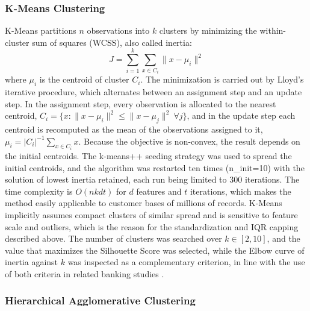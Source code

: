 \documentclass[conference]{IEEEtran}
\begin{document}
\subsubsection{K-Means Clustering}

K-Means \cite{macqueen1967some} partitions $n$ observations into $k$ clusters by minimizing the within-cluster sum of squares (WCSS), also called inertia:
\begin{equation}
    J = \sum_{i=1}^{k} \sum_{x \in C_i} \|x - \mu_i\|^2
\end{equation}
where $\mu_i$ is the centroid of cluster $C_i$. The minimization is carried out by Lloyd's iterative procedure, which alternates between an assignment step and an update step. In the assignment step, every observation is allocated to the nearest centroid, $C_i = \{x : \|x-\mu_i\|^2 \le \|x-\mu_j\|^2\ \forall j\}$, and in the update step each centroid is recomputed as the mean of the observations assigned to it, $\mu_i = |C_i|^{-1}\sum_{x\in C_i}x$. Because the objective is non-convex, the result depends on the initial centroids. The k-means++ seeding strategy was used to spread the initial centroids, and the algorithm was restarted ten times (n\_init=10) with the solution of lowest inertia retained, each run being limited to 300 iterations. The time complexity is $O(nkdt)$ for $d$ features and $t$ iterations, which makes the method easily applicable to customer bases of millions of records. K-Means implicitly assumes compact clusters of similar spread and is sensitive to feature scale and outliers, which is the reason for the standardization and IQR capping described above. The number of clusters was searched over $k\in[2,10]$, and the value that maximizes the Silhouette Score was selected, while the Elbow curve of inertia against $k$ \cite{syakur2018integration} was inspected as a complementary criterion, in line with the use of both criteria in related banking studies \cite{raiter2021,aryuni2018,fouladifar2016}.

\subsubsection{Hierarchical Agglomerative Clustering}
\end{document}
